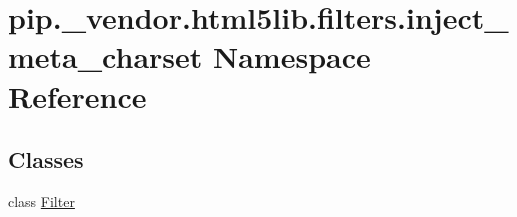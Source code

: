 \hypertarget{namespacepip_1_1__vendor_1_1html5lib_1_1filters_1_1inject__meta__charset}{}\section{pip.\+\_\+vendor.\+html5lib.\+filters.\+inject\+\_\+meta\+\_\+charset Namespace Reference}
\label{namespacepip_1_1__vendor_1_1html5lib_1_1filters_1_1inject__meta__charset}
\subsection*{Classes}
\begin{DoxyCompactItemize}
\item 
class \hyperlink{classpip_1_1__vendor_1_1html5lib_1_1filters_1_1inject__meta__charset_1_1Filter}{Filter}
\end{DoxyCompactItemize}
